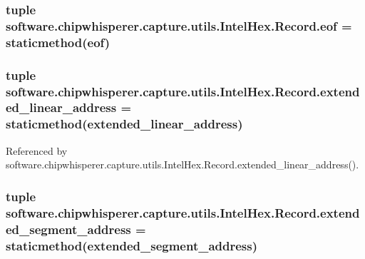 \subsubsection[{eof}]{\setlength{\rightskip}{0pt plus 5cm}tuple software.\+chipwhisperer.\+capture.\+utils.\+Intel\+Hex.\+Record.\+eof = staticmethod(eof)\hspace{0.3cm}{\ttfamily [static]}}\label{classsoftware_1_1chipwhisperer_1_1capture_1_1utils_1_1IntelHex_1_1Record_a477afb71966aed6301c61218c9f4dba1}
\hypertarget{classsoftware_1_1chipwhisperer_1_1capture_1_1utils_1_1IntelHex_1_1Record_a37025192502e973c36cae2704cd0e510}{}
\subsubsection[{extended\+\_\+linear\+\_\+address}]{\setlength{\rightskip}{0pt plus 5cm}tuple software.\+chipwhisperer.\+capture.\+utils.\+Intel\+Hex.\+Record.\+extended\+\_\+linear\+\_\+address = staticmethod(extended\+\_\+linear\+\_\+address)\hspace{0.3cm}{\ttfamily [static]}}\label{classsoftware_1_1chipwhisperer_1_1capture_1_1utils_1_1IntelHex_1_1Record_a37025192502e973c36cae2704cd0e510}


Referenced by software.\+chipwhisperer.\+capture.\+utils.\+Intel\+Hex.\+Record.\+extended\+\_\+linear\+\_\+address().

\hypertarget{classsoftware_1_1chipwhisperer_1_1capture_1_1utils_1_1IntelHex_1_1Record_a2c663a7e9a87820391387ef41f377735}{}
\subsubsection[{extended\+\_\+segment\+\_\+address}]{\setlength{\rightskip}{0pt plus 5cm}tuple software.\+chipwhisperer.\+capture.\+utils.\+Intel\+Hex.\+Record.\+extended\+\_\+segment\+\_\+address = staticmethod(extended\+\_\+segment\+\_\+address)\hspace{0.3cm}{\ttfamily [static]}}\label{classsoftware_1_1chipwhisperer_1_1capture_1_1utils_1_1IntelHex_1_1Record_a2c663a7e9a87820391387ef41f377735}


